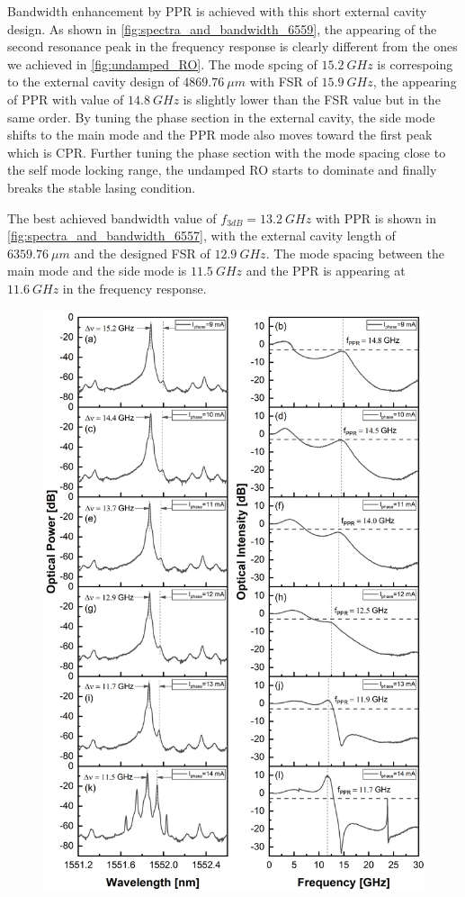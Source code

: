 
Bandwidth enhancement by PPR is achieved with this short external cavity design. As shown in \autoref{fig:spectra_and_bandwidth_6559}, the appearing of the second resonance peak in the frequency response is clearly different from the ones we achieved in \autoref{fig:undamped_RO}. The mode spcing of $15.2 \ GHz$ is correspoing to the external cavity design of $4869.76 \ \mu m$ with FSR of $15.9 \ GHz$, the appearing of PPR with value of $14.8 \ GHz$ is slightly lower than the FSR value but in the same order. By tuning the phase section in the external cavity, the side mode shifts to the main mode and the PPR mode also moves toward the first peak which is CPR. Further tuning the phase section with the mode spacing close to the self mode locking range, the undamped RO starts to dominate and finally breaks the stable lasing condition.

The best achieved bandwidth value of $f_{3dB}=13.2 \ GHz$ with PPR is shown in \autoref{fig:spectra_and_bandwidth_6557}, with the external cavity length of $6359.76 \ \mu m$ and the designed FSR of $12.9 \ GHz$. The mode spacing between the main mode and the side mode is $11.5 \ GHz$ and the PPR is appearing at $11.6 \ GHz$ in the frequency response.

\begin{figure}[ht]
    \centering
    \includegraphics[width=.8\linewidth]{figures/spectra_and_bandwidth_6559.png}
    \caption{}
    \label{fig:spectra_and_bandwidth_6559}
\end{figure}

